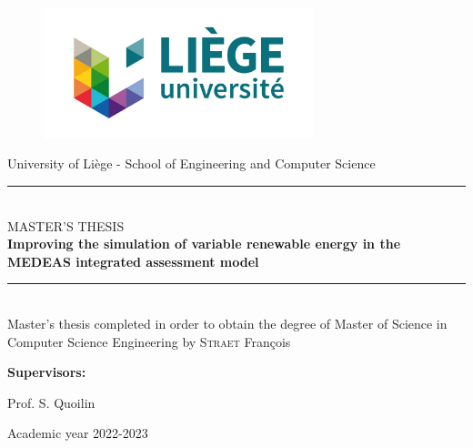 \documentclass[12pt]{article}
\numberwithin{equation}{section}
\numberwithin{figure}{section}
\numberwithin{table}{section}
\begin{document}

\begin{titlepage}

    \begin{center}

    \begin{figure}[t]
        \includegraphics[width=0.7\textwidth]{uliege-logo-couleurs-300.jpg}
        \centering
    \end{figure}
    \large University of Liège - School of Engineering and Computer Science\\[0.5cm]

    \rule{\linewidth}{0.5mm}\\[0.2cm]

    \textsc{\Large MASTER'S THESIS}\\[0.5cm]

    \textbf{\LARGE Improving the simulation of variable renewable energy in the MEDEAS integrated assessment model}

        \rule{\linewidth}{0.5mm}\\[2cm]

        Master's thesis completed in order to obtain the degree of Master of Science in Computer Science Engineering by \textsc{Straet} François\\[4cm]

    \end{center}

    \textbf{Supervisors:}

    Prof. S. Quoilin\\[2cm]
    

    \center

    Academic year 2022-2023

\end{titlepage}
















\nocite{*}


\printbibliography[heading=bibintoc]

\setcounter{tocdepth}{0}
\setcounter{secnumdepth}{0}


\end{document}
